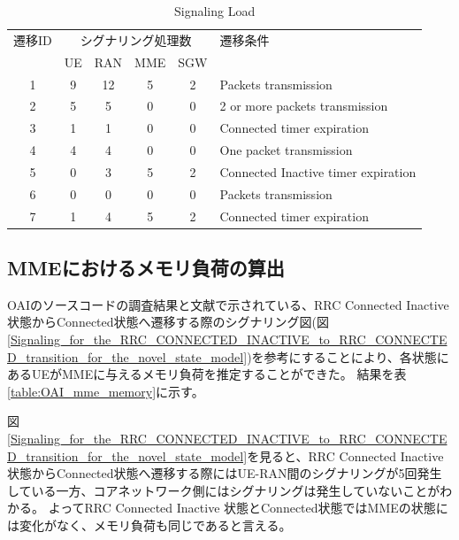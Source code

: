 \documentclass[a4j]{ujarticle}
\begin{document}
\begin{table}[htbp]
  \centering
  \caption{Signaling Load}
  \label{table:signalings_all}
  \begin{tabular}{c|cccc|l}
    \hline
    遷移ID  & \multicolumn{4}{|c|}{シグナリング処理数} & 遷移条件                          \\
            & UE      & RAN     & MME     & SGW      &                                   \\ \hline \hline
    1       & 9       & 12      & 5       & 2        & Packets transmission              \\
    2       & 5       & 5       & 0       & 0        & 2 or more packets transmission    \\
    3       & 1       & 1       & 0       & 0        & Connected timer expiration        \\
    4       & 4       & 4       & 0       & 0        & One packet transmission           \\
    5       & 0       & 3       & 5       & 2        & Connected Inactive timer expiration             \\
    6       & 0       & 0       & 0       & 0        & Packets transmission              \\
    7       & 1       & 4       & 5       & 2        & Connected timer expiration            \\ \hline
  \end{tabular}
\end{table}
\clearpage

\subsection{MMEにおけるメモリ負荷の算出}
OAIのソースコードの調査結果と文献\cite{ANovelStateModelfor5GRadioAccessNetworks}で示されている、RRC Connected Inactive 状態からConnected状態へ遷移する際のシグナリング図(図\ref{Signaling_for_the_RRC_CONNECTED_INACTIVE_to_RRC_CONNECTED_transition_for_the_novel_state_model})を参考にすることにより、各状態にあるUEがMMEに与えるメモリ負荷を推定することができた。
結果を表\ref{table:OAI_mme_memory}に示す。

図\ref{Signaling_for_the_RRC_CONNECTED_INACTIVE_to_RRC_CONNECTED_transition_for_the_novel_state_model}を見ると、RRC Connected Inactive 状態からConnected状態へ遷移する際にはUE-RAN間のシグナリングが5回発生している一方、コアネットワーク側にはシグナリングは発生していないことがわかる。
よってRRC Connected Inactive 状態とConnected状態ではMMEの状態には変化がなく、メモリ負荷も同じであると言える。
\end{document}
